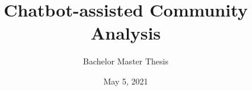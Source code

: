 \newcommand*{\BACHELOR}{}
\title{Chatbot-assisted Community Analysis}
\subtitle{\ifdefined\BACHELOR Bachelor \else Master \fi Thesis \ifdefined\PROPOSAL
		\PROPOSAL
	\fi}
\date{May 5, 2021}
\newcommand{\firstname}{Ben Aziz}
\newcommand{\lastname}{Lakhoune}
\newcommand{\matrNo}{380163}
\newcommand{\email}{ben.lakhoune@rwth-aachen.de}
\newcommand{\studyProgram}{\ifdefined\BACHELOR Bachelor \else Master \fi Computer Science}

\newcommand{\firstsupervisor}{PD Dr. Ralf Klamma}
\newcommand{\firstsupervisorchair}{Chair of Information Systems}
\newcommand{\firstsupervisoruniversity}{RWTH Aachen University}

\newcommand{\secondsupervisor}{Prof. Dr. Matthias Jarke}
\newcommand{\secondsupervisorchair}{Chair of Information Systems}
\newcommand{\secondsupervisoruniversity}{RWTH Aachen University}


\newcommand{\firstadvisor}{Alexander Neumann}
\newcommand{\firstadvisorchair}{Chair of Information Systems}
\newcommand{\firstadvisoruniversity}{RWTH Aachen University}

